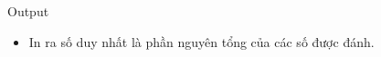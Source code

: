 Output  
\begin{itemize}
	\item     In ra số duy nhất là phần nguyên tổng của các số được đánh.   
\end{itemize}